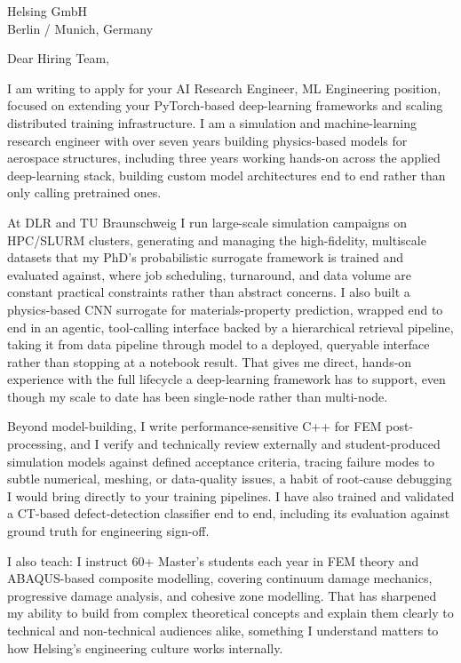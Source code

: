 \documentclass[10pt]{letter}
\begin{document}
\begin{letter}{Helsing GmbH \\ Berlin / Munich, Germany}
\opening{Dear Hiring Team,}

I am writing to apply for your AI Research Engineer, ML Engineering position, focused on extending your PyTorch-based deep-learning frameworks and scaling distributed training infrastructure. I am a simulation and machine-learning research engineer with over seven years building physics-based models for aerospace structures, including three years working hands-on across the applied deep-learning stack, building custom model architectures end to end rather than only calling pretrained ones.

At DLR and TU Braunschweig I run large-scale simulation campaigns on HPC/SLURM clusters, generating and managing the high-fidelity, multiscale datasets that my PhD's probabilistic surrogate framework is trained and evaluated against, where job scheduling, turnaround, and data volume are constant practical constraints rather than abstract concerns. I also built a physics-based CNN surrogate for materials-property prediction, wrapped end to end in an agentic, tool-calling interface backed by a hierarchical retrieval pipeline, taking it from data pipeline through model to a deployed, queryable interface rather than stopping at a notebook result. That gives me direct, hands-on experience with the full lifecycle a deep-learning framework has to support, even though my scale to date has been single-node rather than multi-node.

Beyond model-building, I write performance-sensitive C++ for FEM post-processing, and I verify and technically review externally and student-produced simulation models against defined acceptance criteria, tracing failure modes to subtle numerical, meshing, or data-quality issues, a habit of root-cause debugging I would bring directly to your training pipelines. I have also trained and validated a CT-based defect-detection classifier end to end, including its evaluation against ground truth for engineering sign-off.

I also teach: I instruct 60+ Master's students each year in FEM theory and ABAQUS-based composite modelling, covering continuum damage mechanics, progressive damage analysis, and cohesive zone modelling. That has sharpened my ability to build from complex theoretical concepts and explain them clearly to technical and non-technical audiences alike, something I understand matters to how Helsing's engineering culture works internally.


\end{letter}
\end{document}
